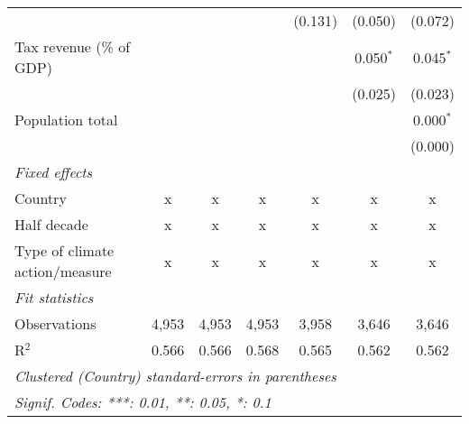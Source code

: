 \begin{tabular}{lcccccc}
                                                       &         &              &                & (0.131)        & (0.050)        & (0.072)\\   
   Tax revenue (\% of GDP)                             &         &              &                &                & 0.050$^{*}$    & 0.045$^{*}$\\   
                                                       &         &              &                &                & (0.025)        & (0.023)\\   
   Population total                                    &         &              &                &                &                & 0.000$^{*}$\\   
                                                       &         &              &                &                &                & (0.000)\\   
   \emph{Fixed effects}\\
   Country                                             & x       & x            & x              & x              & x              & x\\  
   Half decade                                         & x       & x            & x              & x              & x              & x\\  
   Type of climate action/measure                      & x       & x            & x              & x              & x              & x\\  
   \midrule \emph{Fit statistics}\\
   Observations                                        & 4,953   & 4,953        & 4,953          & 3,958          & 3,646          & 3,646\\  
   R$^2$                                               & 0.566   & 0.566        & 0.568          & 0.565          & 0.562          & 0.562\\  
   \midrule
   \multicolumn{7}{l}{\emph{Clustered (Country) standard-errors in parentheses}}\\
   \multicolumn{7}{l}{\emph{Signif. Codes: ***: 0.01, **: 0.05, *: 0.1}}\\
\end{tabular}
\par\endgroup


